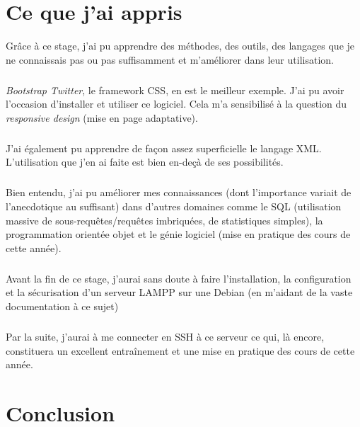\documentclass[a4paper,12pt,titlepage]{report}
\begin{document}
\chapter{Ce que j'ai appris}

Grâce à ce stage, j'ai pu apprendre des méthodes, des outils, des langages que je ne connaissais pas ou pas suffisamment et m'améliorer dans leur utilisation.

\paragraph*{}
\emph{Bootstrap Twitter}, le framework CSS, en est le meilleur exemple. J'ai pu avoir l'occasion d'installer et utiliser ce logiciel. Cela m'a sensibilisé à la question du \emph{responsive design} (mise en page adaptative).

\paragraph*{}
J'ai également pu apprendre de façon assez superficielle le langage XML. L'utilisation que j'en ai faite est bien en-deçà de ses possibilités.

\paragraph*{}
Bien entendu, j'ai pu améliorer mes connaissances (dont l'importance variait de l'anecdotique au suffisant) dans d'autres domaines comme le SQL (utilisation massive de sous-requêtes/requêtes imbriquées, de statistiques simples), la programmation orientée objet et le génie logiciel (mise en pratique des cours de cette année).

\paragraph*{}
Avant la fin de ce stage, j'aurai sans doute à faire l'installation, la configuration et la sécurisation d'un serveur LAMPP sur une Debian (en m'aidant de la vaste documentation à ce sujet)
\paragraph*{}
Par la suite, j'aurai à me connecter en SSH à ce serveur ce qui, là encore, constituera un excellent entraînement et une mise en pratique des cours de cette année.



\chapter{Conclusion}
\end{document}
